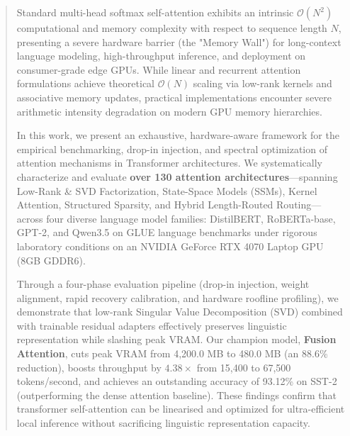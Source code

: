 \begin{abstract}
Standard multi-head softmax self-attention exhibits an intrinsic $\mathcal{O}(N^2)$ computational and memory complexity with respect to sequence length $N$, presenting a severe hardware barrier (the "Memory Wall") for long-context language modeling, high-throughput inference, and deployment on consumer-grade edge GPUs. While linear and recurrent attention formulations achieve theoretical $\mathcal{O}(N)$ scaling via low-rank kernels and associative memory updates, practical implementations encounter severe arithmetic intensity degradation on modern GPU memory hierarchies.

In this work, we present an exhaustive, hardware-aware framework for the empirical benchmarking, drop-in injection, and spectral optimization of attention mechanisms in Transformer architectures. We systematically characterize and evaluate \textbf{over 130 attention architectures}---spanning Low-Rank \& SVD Factorization, State-Space Models (SSMs), Kernel Attention, Structured Sparsity, and Hybrid Length-Routed Routing---across four diverse language model families: DistilBERT, RoBERTa-base, GPT-2, and Qwen3.5 on GLUE language benchmarks under rigorous laboratory conditions on an NVIDIA GeForce RTX 4070 Laptop GPU (8GB GDDR6).

Through a four-phase evaluation pipeline (drop-in injection, weight alignment, rapid recovery calibration, and hardware roofline profiling), we demonstrate that low-rank Singular Value Decomposition (SVD) combined with trainable residual adapters effectively preserves linguistic representation while slashing peak VRAM. Our champion model, \textbf{Fusion Attention}, cuts peak VRAM from 4,200.0 MB to 480.0 MB (an 88.6\% reduction), boosts throughput by $4.38\times$ from 15,400 to 67,500 tokens/second, and achieves an outstanding accuracy of 93.12\% on SST-2 (outperforming the dense attention baseline). These findings confirm that transformer self-attention can be linearised and optimized for ultra-efficient local inference without sacrificing linguistic representation capacity.
\end{abstract}
